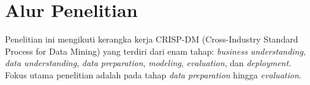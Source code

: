 \section{Alur Penelitian}

Penelitian ini mengikuti kerangka kerja CRISP-DM (Cross-Industry Standard Process for Data Mining) yang terdiri dari enam tahap: \emph{business understanding}, \emph{data understanding}, \emph{data preparation}, \emph{modeling}, \emph{evaluation}, dan \emph{deployment}. Fokus utama penelitian adalah pada tahap \emph{data preparation} hingga \emph{evaluation}.
